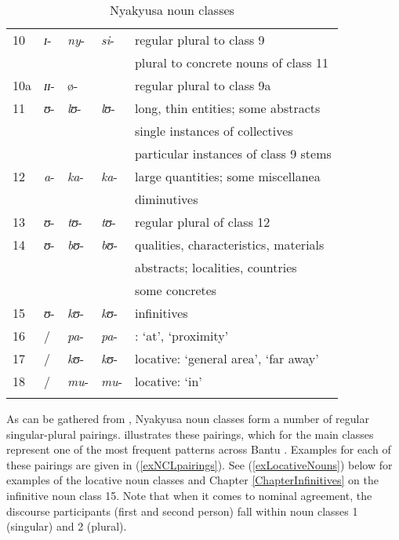 \begin{table}
\begin{tabularx}{\textwidth}{lllll}
	10 & \textit{ɪ}- & \textit{ny}- & \textit{si}- & regular plural to class 9 
	\tabularnewline & & & &plural to concrete nouns of class 11 \\ 
	
	10a & \textit{ɪɪ}- & ø- & & regular plural to class 9a \\ 
	
	11 & \textit{ʊ}- & \textit{lʊ}- & \textit{lʊ}- & long, thin entities; some abstracts \tabularnewline & & &  & single instances of collectives
	\tabularnewline &  & &  & particular instances of class 9 stems \\ 
	
	12 & \textit{a}- & \textit{ka}- & \textit{ka}- & large quantities; some miscellanea
	\tabularnewline &  & &  & diminutives \\ 
	
	13 & \textit{ʊ}- & \textit{tʊ}- & \textit{tʊ}- & regular plural of class 12 \\ 
		
	14 & \textit{ʊ}- & \textit{bʊ}- & \textit{bʊ}- & qualities, characteristics, materials
	\tabularnewline &  & &  & abstracts; localities, countries
	\tabularnewline &  & &  &  some concretes \\
	
	15 & \textit{ʊ}- & \textit{kʊ}- & \textit{kʊ}- & infinitives \\ 
	
	16 & / & \textit{pa}- & \textit{pa}- & \isi{locative}: \lq at', `proximity' \\ 
	
	17 & / & \textit{kʊ}- & \textit{kʊ}- & locative: \lq general area', `far away' \\ 
	
	18 & / & \textit{mu}- & \textit{mu}- & locative: `in' \\ 
	\lspbottomrule 
\end{tabularx}
\caption[]{Nyakyusa noun classes} \label{TableSemanticsNCL}
\end{table}

As can be gathered from , Nyakyusa noun classes form a number of regular singular-plural pairings.  illustrates these pairings, which for the main classes represent one of the most frequent patterns across Bantu \citep[109]{KatambaF2003}. Examples for each of these pairings are given in (\ref{exNCLpairings}). See (\ref{exLocativeNouns}) below for examples of the locative noun classes and Chapter \ref{ChapterInfinitives} on the infinitive noun class 15. Note that when it comes to nominal agreement, the discourse participants (first and second person) fall within noun classes 1 (singular) and 2 (plural).

